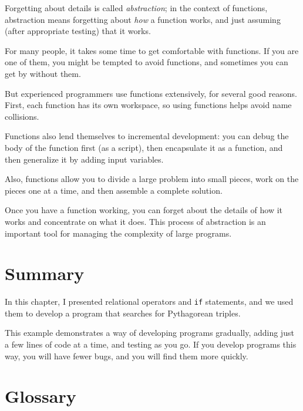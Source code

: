 
Forgetting about details is called {\em abstraction}; in the context
of functions, abstraction means forgetting about {\em how} a function
works, and just assuming (after appropriate testing) that it works.

For many people, it takes some time to get comfortable with functions.  If you are one of them, you might be tempted to avoid functions, and sometimes you can get by without them.

But experienced programmers use functions extensively, for several good reasons. First, each function has its own workspace, so using functions helps
avoid name collisions. 

Functions also lend themselves to incremental development: you can
debug the body of the function first (as a script), then encapsulate
it as a function, and then generalize it by adding input variables.

Also, functions allow you to divide a large problem into small
pieces, work on the pieces one at a time, and then assemble a
complete solution. 

Once you have a function working, you can forget about the
details of how it works and concentrate on what it does.  This
process of abstraction is an important tool for managing the
complexity of large programs.


\section{Summary}

In this chapter, I presented relational operators and {\tt if} statements, and we used them to develop a program that searches for Pythagorean triples.

This example demonstrates a way of developing programs gradually, adding just a few lines of code at a time, and testing as you go.  If you develop programs this way, you will have fewer bugs, and you will find them more quickly.


\section{Glossary}

